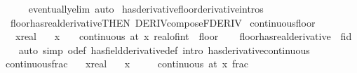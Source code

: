 \begin{isabellebody}
\ \ \ \ \isamarkupfalse%
\ eventually{\isacharunderscore}{\kern0pt}elim\ auto\isanewline
{}\isamarkupfalse%
%
\endisatagproof
{\isafoldproof}%
%
\isadelimproof
\isanewline
%
\endisadelimproof
\isanewline
{}\isamarkupfalse%
\ has{\isacharunderscore}{\kern0pt}derivative{\isacharunderscore}{\kern0pt}floor{\isacharbrackleft}{\kern0pt}derivative{\isacharunderscore}{\kern0pt}intros{\isacharbrackright}{\kern0pt}\ {\isacharequal}{\kern0pt}\isanewline
\ \ floor{\isacharunderscore}{\kern0pt}has{\isacharunderscore}{\kern0pt}real{\isacharunderscore}{\kern0pt}derivative{\isacharbrackleft}{\kern0pt}THEN\ DERIV{\isacharunderscore}{\kern0pt}compose{\isacharunderscore}{\kern0pt}FDERIV{\isacharbrackright}{\kern0pt}\isanewline
\isanewline
{}\isamarkupfalse%
\ continuous{\isacharunderscore}{\kern0pt}floor{\isacharcolon}{\kern0pt}\isanewline
\ \ \ x{\isacharcolon}{\kern0pt}{\isacharcolon}{\kern0pt}real\isanewline
\ \ \ {\isachardoublequoteopen}x\ {\isasymnotin}\ {\isasymint}\ {\isasymLongrightarrow}\ continuous\ {\isacharparenleft}{\kern0pt}at\ x{\isacharparenright}{\kern0pt}\ {\isacharparenleft}{\kern0pt}real{\isacharunderscore}{\kern0pt}of{\isacharunderscore}{\kern0pt}int\ {\isasymcirc}\ floor{\isacharparenright}{\kern0pt}{\isachardoublequoteclose}\isanewline
%
\isadelimproof
\ \ %
\endisadelimproof
%
\isatagproof
{}\isamarkupfalse%
\ floor{\isacharunderscore}{\kern0pt}has{\isacharunderscore}{\kern0pt}real{\isacharunderscore}{\kern0pt}derivative\ {\isacharbrackleft}{\kern0pt}\ f{\isacharequal}{\kern0pt}id{\isacharbrackright}{\kern0pt}\isanewline
\ \ \isamarkupfalse%
\ {\isacharparenleft}{\kern0pt}auto\ simp{\isacharcolon}{\kern0pt}\ o{\isacharunderscore}{\kern0pt}def\ has{\isacharunderscore}{\kern0pt}field{\isacharunderscore}{\kern0pt}derivative{\isacharunderscore}{\kern0pt}def\ intro{\isacharcolon}{\kern0pt}\ has{\isacharunderscore}{\kern0pt}derivative{\isacharunderscore}{\kern0pt}continuous{\isacharparenright}{\kern0pt}%
\endisatagproof
{\isafoldproof}%
%
\isadelimproof
\isanewline
%
\endisadelimproof
\isanewline
{}\isamarkupfalse%
\ continuous{\isacharunderscore}{\kern0pt}frac{\isacharcolon}{\kern0pt}\isanewline
\ \ \ x{\isacharcolon}{\kern0pt}{\isacharcolon}{\kern0pt}real\isanewline
\ \ \ {\isachardoublequoteopen}x\ {\isasymnotin}\ {\isasymint}{\isachardoublequoteclose}\isanewline
\ \ \ {\isachardoublequoteopen}continuous\ {\isacharparenleft}{\kern0pt}at\ x{\isacharparenright}{\kern0pt}\ frac{\isachardoublequoteclose}\isanewline

\end{isabellebody}
